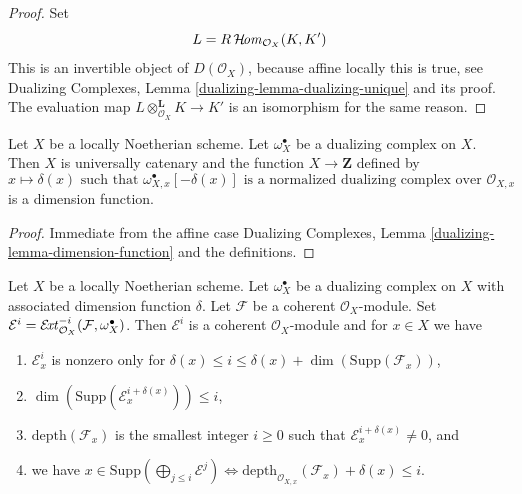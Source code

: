 \begin{proof}
Set
$$
L = R\mathop{\mathcal{H}\!\mathit{om}}\nolimits_{\mathcal{O}_X}(K, K')
$$
This is an invertible object of $D(\mathcal{O}_X)$, because affine locally
this is true, see Dualizing Complexes, Lemma
\ref{dualizing-lemma-dualizing-unique} and its proof.
The evaluation map $L \otimes_{\mathcal{O}_X}^\mathbf{L} K \to K'$
is an isomorphism for the same reason.
\end{proof}

\begin{lemma}
\label{lemma-dimension-function-scheme}
Let $X$ be a locally Noetherian scheme. Let $\omega_X^\bullet$
be a dualizing complex on $X$. Then $X$ is universally catenary
and the function
$X \to \mathbf{Z}$ defined by
$$
x \longmapsto \delta(x)\text{ such that }
\omega_{X, x}^\bullet[-\delta(x)]
\text{ is a normalized dualizing complex over }
\mathcal{O}_{X, x}
$$
is a dimension function.
\end{lemma}

\begin{proof}
Immediate from the affine case
Dualizing Complexes, Lemma \ref{dualizing-lemma-dimension-function}
and the definitions.
\end{proof}

\begin{lemma}
\label{lemma-sitting-in-degrees}
Let $X$ be a locally Noetherian scheme. Let $\omega_X^\bullet$
be a dualizing complex on $X$ with associated dimension function $\delta$.
Let $\mathcal{F}$ be a coherent $\mathcal{O}_X$-module. Set
$\mathcal{E}^i = \mathop{\mathcal{E}\!\mathit{xt}}\nolimits^{-i}_{\mathcal{O}_X}(\mathcal{F}, \omega_X^\bullet)$.
Then $\mathcal{E}^i$ is a coherent $\mathcal{O}_X$-module and
for $x \in X$ we have
\begin{enumerate}
\item $\mathcal{E}^i_x$ is nonzero only for
$\delta(x) \leq i \leq \delta(x) + \dim(\text{Supp}(\mathcal{F}_x))$,
\item $\dim(\text{Supp}(\mathcal{E}^{i + \delta(x)}_x)) \leq i$,
\item $\text{depth}(\mathcal{F}_x)$ is the smallest integer
$i \geq 0$ such that $\mathcal{E}_x^{i + \delta(x)} \not = 0$, and
\item we have
$x \in \text{Supp}(\bigoplus_{j \leq i} \mathcal{E}^j)
\Leftrightarrow
\text{depth}_{\mathcal{O}_{X, x}}(\mathcal{F}_x) + \delta(x) \leq i$.
\end{enumerate}
\end{lemma}

